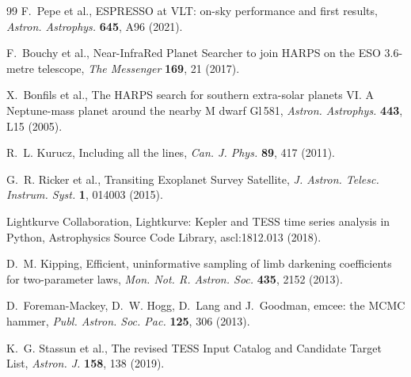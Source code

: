 \documentclass[3p,11pt]{elsarticle}
\begin{document}
\begin{thebibliography}{99}
F.~Pepe et al., ESPRESSO at VLT: on-sky performance and first results, \emph{Astron. Astrophys.}
\textbf{645}, A96 (2021).

F.~Bouchy et al., Near-InfraRed Planet Searcher to join HARPS on the ESO 3.6-metre telescope,
\emph{The Messenger} \textbf{169}, 21 (2017).

X.~Bonfils et al., The HARPS search for southern extra-solar planets VI. A Neptune-mass planet
around the nearby M dwarf Gl\,581, \emph{Astron. Astrophys.} \textbf{443}, L15 (2005).

R.~L. Kurucz, Including all the lines, \emph{Can. J. Phys.} \textbf{89}, 417 (2011).

G.~R. Ricker et al., Transiting Exoplanet Survey Satellite, \emph{J. Astron. Telesc. Instrum.
Syst.} \textbf{1}, 014003 (2015).

Lightkurve Collaboration, Lightkurve: Kepler and TESS time series analysis in Python,
Astrophysics Source Code Library, ascl:1812.013 (2018).

D.~M. Kipping, Efficient, uninformative sampling of limb darkening coefficients for two-parameter
laws, \emph{Mon. Not. R. Astron. Soc.} \textbf{435}, 2152 (2013).

D.~Foreman-Mackey, D.~W. Hogg, D.~Lang and J.~Goodman, emcee: the MCMC hammer, \emph{Publ. Astron.
Soc. Pac.} \textbf{125}, 306 (2013).

K.~G. Stassun et al., The revised TESS Input Catalog and Candidate Target List, \emph{Astron. J.}
\textbf{158}, 138 (2019).

\end{thebibliography}
\end{document}
